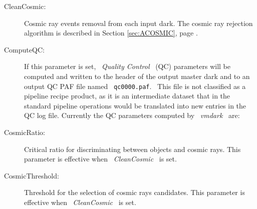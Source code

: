 \begin{description}
\item [CleanCosmic:]    Cosmic ray events removal from each input dark.
                        The cosmic ray rejection algorithm is described 
                        in Section \ref{sec:ACOSMIC}, page \pageref{sec:ACOSMIC}.

\item [ComputeQC:]      If this parameter is set, \ {\it Quality Control}
                        \ (QC) parameters will be computed and written to 
                        the header of the output master dark and to an 
                        output QC PAF file named \ {\tt qc0000.paf}. 
                        \ This file is not classified as a pipeline recipe 
                        product, as it is an intermediate dataset 
                        that in the standard pipeline operations would 
                        be translated into new entries in the QC log file. 
                        Currently the QC parameters computed by 
                        \ {\it vmdark} \ are:


\item [CosmicRatio:]    Critical ratio for discriminating between
                        objects and cosmic rays. This parameter is 
                        effective when \ {\it CleanCosmic} \ is set.

\item [CosmicThreshold:]  Threshold for the selection of cosmic rays
                        candidates. This parameter is effective when 
                        \ {\it CleanCosmic} \ is set.


\end{description}
